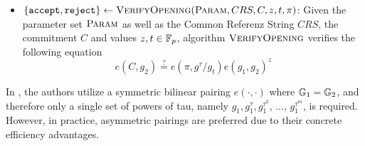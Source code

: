 \begin{itemize}
\item $\{\mathtt{accept},\mathtt{reject}\}\leftarrow \textsc{VerifyOpening}(\textsc{Param}, CRS,C,z,t,\pi)$: Given the parameter set $\textsc{Param}$ as well as the Common Referenz String $CRS$, the commitment $C$ and values $z,t\in \mathbb{F}_p$, algorithm $\textsc{VerifyOpening}$ verifies the following equation
\begin{equation}
e(C,g_2) \stackrel{?}{=} e(\pi,g^{\tau}/g_t)e(g_1,g_2)^{z}
\end{equation}
\end{itemize} 

\begin{remark}
In \citep{kate-10}, the authors utilize a symmetric bilinear pairing $e(\cdot,\cdot)$ where $\mathbb{G}_1=\mathbb{G}_2$, and therefore only a single set of powers of tau, namely $g_1,g_1^\tau, g_1^{\tau^2}$, $\ldots$, $g_1^{\tau^m}$, is required. However, in practice, asymmetric pairings are preferred due to their concrete efficiency advantages.
\end{remark}